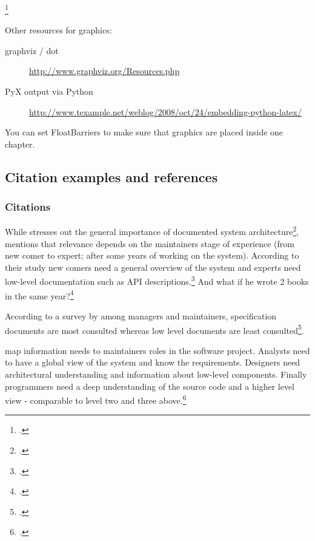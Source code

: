 \footcitetext[Cf.][99]{kopka_guide_2003}

Other resources for graphics:
\begin{description}
  \item[graphviz / dot] \url{http://www.graphviz.org/Resources.php}
  \item[PyX output via Python] \url{http://www.texample.net/weblog/2008/oct/24/embedding-python-latex/}
\end{description}

You can set FloatBarriers to make sure that graphics are placed inside one
chapter.

\FloatBarrier %
\newpage





\subsection{Citation examples and references}
\label{sec:citation}

\subsubsection{Citations}

While \citeauthor{tilley_1992} stresses out the general importance of documented
system architecture\footcite[Cf.][]{tilley_1992}, 
\citeauthor{cioch_96} mentions that relevance depends on the
maintainers stage of experience (from new comer to expert; after some years of
working on the system). According to their study new comers need a general
overview of the system and experts need low-level documentation such as API
descriptions.\footcite[Cf.][]{cioch_96}
And what if he wrote 2 books in the same year?\footcite[Cf.][]{cioch_96a}

According to a survey by \citeauthor{forward_relevance_2002} among managers and
maintainers, specification documents are most consulted whereas low level
documents are least consulted\footcite[Cf.][28-30]{forward_relevance_2002}.

\citeauthor{grubb2003software} map information needs to maintainers roles
in the software project. Analysts need to have a global view of the system and
know the requirements. Designers need architectural understanding and
information about low-level components. Finally programmers need a deep
understanding of the source code and a higher level view - comparable to level
two and three above.\footcite[Cf.][103-106]{grubb2003software}

